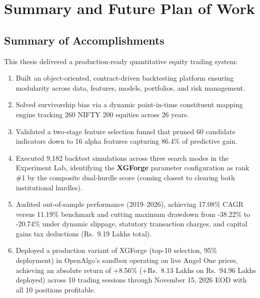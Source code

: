 \section{Summary and Future Plan of Work}
\label{sec:summary_future}

\subsection{Summary of Accomplishments}
This thesis delivered a production-ready quantitative equity trading system:
\begin{enumerate}
    \item Built an object-oriented, contract-driven backtesting platform ensuring modularity across data, features, models, portfolios, and risk management.
    \item Solved survivorship bias via a dynamic point-in-time constituent mapping engine tracking 260 NIFTY 200 equities across 26 years.
    \item Validated a two-stage feature selection funnel that pruned 60 candidate indicators down to 16 alpha features capturing 86.4\% of predictive gain.
    \item Executed 9,182 backtest simulations across three search modes in the Experiment Lab, identifying the \textbf{XGForge} parameter configuration as rank \#1 by the composite dual-hurdle score (coming closest to clearing both institutional hurdles).
    \item Audited out-of-sample performance (2019--2026), achieving 17.08\% CAGR versus 11.19\% benchmark and cutting maximum drawdown from -38.22\% to -20.74\% under dynamic slippage, statutory transaction charges, and capital gains tax deductions (\textsf{Rs.~}9.19 Lakhs total).
    \item Deployed a production variant of XGForge (top-10 selection, 95\% deployment) in OpenAlgo's sandbox operating on live Angel One prices, achieving an absolute return of +8.56\% (+\textsf{Rs.~}8.13 Lakhs on \textsf{Rs.~}94.96 Lakhs deployed) across 10 trading sessions through November 15, 2026 EOD with all 10 positions profitable.
\end{enumerate}

